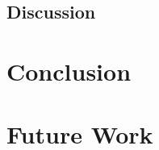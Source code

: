 \documentclass[conference]{IEEEtran}
\begin{document}
\subsection{Discussion}

\section{Conclusion}

\section{Future Work}


%
%

\end{document}
